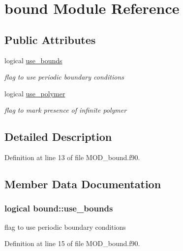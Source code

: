 \hypertarget{classbound}{\section{bound Module Reference}
\label{classbound}
}
\subsection*{Public Attributes}
\begin{DoxyCompactItemize}
\item 
logical \hyperlink{classbound_ad35bc5a4efc24e536e939041415e56f3}{use\-\_\-bounds}
\begin{DoxyCompactList}\small\item\em flag to use periodic boundary conditions \end{DoxyCompactList}\item 
logical \hyperlink{classbound_ac47b8ce758ea3ac44b1af1f2876267e9}{use\-\_\-polymer}
\begin{DoxyCompactList}\small\item\em flag to mark presence of infinite polymer \end{DoxyCompactList}\end{DoxyCompactItemize}


\subsection{Detailed Description}


Definition at line 13 of file M\-O\-D\-\_\-bound.\-f90.



\subsection{Member Data Documentation}
\hypertarget{classbound_ad35bc5a4efc24e536e939041415e56f3}{
\subsubsection[{use\-\_\-bounds}]{\setlength{\rightskip}{0pt plus 5cm}logical bound\-::use\-\_\-bounds}}\label{classbound_ad35bc5a4efc24e536e939041415e56f3}


flag to use periodic boundary conditions 



Definition at line 15 of file M\-O\-D\-\_\-bound.\-f90.

